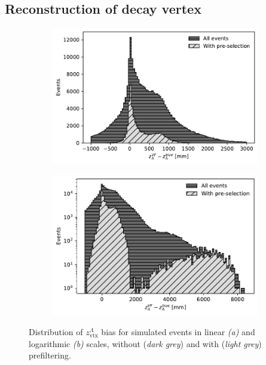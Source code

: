 \subsection{Reconstruction of \texorpdfstring{\lz}{Lambda} decay vertex}
\label{sec:lambda_endvertex_bias}
\begin{figure}[t]
	\centering
	\begin{subfigure}{.45\textwidth}
		\includegraphics[width=\textwidth]{graphics/04-event_selection/Lambda_endvertex_bias_z.pdf}
		\caption{}
	\end{subfigure}
	\begin{subfigure}{.45\textwidth}
		\includegraphics[width=\textwidth]{graphics/04-event_selection/Lambda_endvertex_bias_z_log.pdf}
		\caption{}
	\end{subfigure}
	\caption{Distribution of $z_\text{vtx}^\Lambda$ bias for simulated \demonstratorshort events in linear \textit{(a)} and logarithmic \textit{(b)} scales, without (\textit{dark grey}) and with (\textit{light grey}) prefiltering.}
\end{figure}

